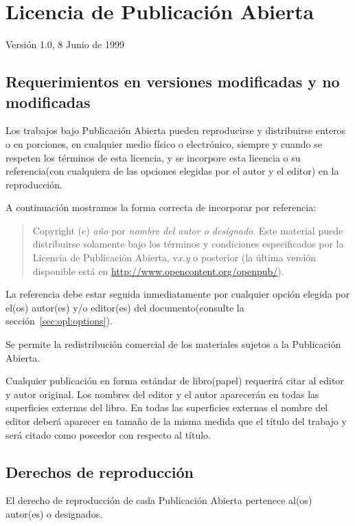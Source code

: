 \chapter{Licencia de Publicación Abierta}
\label{cha:opl}

Versión 1.0, 8 Junio de 1999

\section{Requerimientos en versiones modificadas y no modificadas}

Los trabajos bajo Publicación Abierta pueden reproducirse y
distribuirse enteros o en porciones, en cualquier medio físico o
electrónico, siempre y cuando se respeten los términos de esta 
licencia, y se incorpore esta licencia o su referencia(con cualquiera
de las opciones elegidas por el autor y el editor) en la reproducción.

A continuación mostramos la forma correcta de incorporar por referencia:

\begin{quote}
  Copyright (c) \emph{año} por \emph{nombre del autor o designado}.
  Este material puede distribuirse solamente bajo los términos y
  condiciones especificados por la Licencia de Publicación Abierta,
  v\emph{x.y} o  posterior (la última versión disponible está en
  \url{http://www.opencontent.org/openpub/}).
\end{quote}

La referencia debe estar seguida inmediatamente por cualquier opción
elegida por el(os) autor(es) y/o editor(es) del documento(consulte la
sección~\ref{sec:opl:options}).

Se permite la redistribución comercial de los materiales sujetos a la
Publicación Abierta.

Cualquier publicación en forma estándar de libro(papel) requerirá
citar al editor y autor original.  Los nombres del editor y el autor
aparecerán en todas las superficies externas del libro.  En todas las
superficies externas el nombre del editor deberá aparecer en tamaño de
la misma medida que el título del trabajo y será citado como poseedor
con respecto al título.

\section{Derechos de reproducción}

El derecho de reproducción de cada Publicación Abierta pertenece
al(os) autor(es) o designados.

